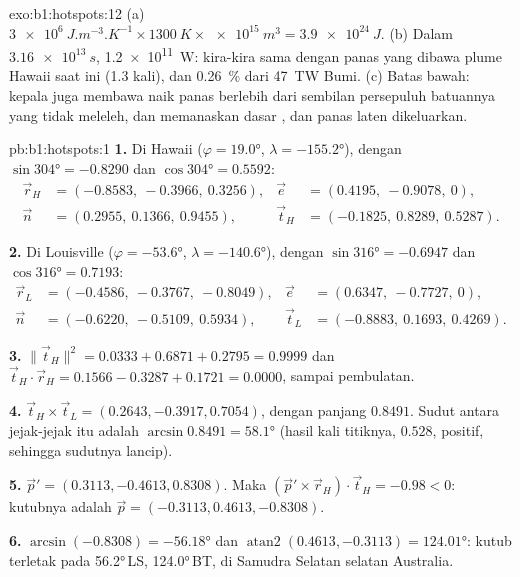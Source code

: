 \begin{solution}{exo:b1:hotspots:12}
(a) $\qty{3e6}{J.m^{-3}.K^{-1}}\times\qty{1300}{K}\times\qty{e15}{m^3} =
\qty{3.9e24}{J}$. (b) Dalam $\qty{3.16e13}{s}$, \qty{1.2e11}{W}: kira-kira sama dengan
panas yang dibawa plume Hawaii saat ini (1.3 kali), dan \qty{0.26}{\percent}
dari \qty{47}{TW} Bumi. (c) Batas bawah: kepala juga membawa naik panas berlebih dari
sembilan persepuluh batuannya yang tidak meleleh, dan memanaskan dasar , dan panas laten dikeluarkan.
\end{solution}

\begin{solution}{pb:b1:hotspots:1}
\textbf{1.} Di Hawaii ($\varphi = \ang{19.0}$, $\lambda = \ang{-155.2}$),
dengan $\sin\ang{304} = -0.8290$ dan $\cos\ang{304} = 0.5592$:
\[
\begin{aligned}
  \vec r_H &= (-0.8583,\ -0.3966,\ 0.3256), &
  \vec e &= (0.4195,\ -0.9078,\ 0),\\
  \vec n &= (0.2955,\ 0.1366,\ 0.9455), &
  \vec t_H &= (-0.1825,\ 0.8289,\ 0.5287).
\end{aligned}
\]

\textbf{2.} Di Louisville ($\varphi = \ang{-53.6}$, $\lambda = \ang{-140.6}$),
dengan $\sin\ang{316} = -0.6947$ dan $\cos\ang{316} = 0.7193$:
\[
\begin{aligned}
  \vec r_L &= (-0.4586,\ -0.3767,\ -0.8049), &
  \vec e &= (0.6347,\ -0.7727,\ 0),\\
  \vec n &= (-0.6220,\ -0.5109,\ 0.5934), &
  \vec t_L &= (-0.8883,\ 0.1693,\ 0.4269).
\end{aligned}
\]

\textbf{3.} $\lVert\vec t_H\rVert^2 = 0.0333 + 0.6871 + 0.2795 = 0.9999$ dan
$\vec t_H\cdot\vec r_H = 0.1566 - 0.3287 + 0.1721 = 0.0000$, sampai pembulatan.

\textbf{4.} $\vec t_H\times\vec t_L = (0.2643, -0.3917, 0.7054)$, dengan panjang
$0.8491$. Sudut antara jejak-jejak itu adalah $\arcsin0.8491 = \ang{58.1}$ (hasil kali
titiknya, $0.528$, positif, sehingga sudutnya lancip).

\textbf{5.} $\vec p' = (0.3113, -0.4613, 0.8308)$. Maka
$(\vec p'\times\vec r_H)\cdot\vec t_H = -0.98 < 0$: kutubnya adalah
$\vec p = (-0.3113, 0.4613, -0.8308)$.

\textbf{6.} $\arcsin(-0.8308) = \ang{-56.18}$ dan
$\operatorname{atan2}(0.4613, -0.3113) = \ang{124.01}$: kutub terletak pada
\ang{56.2}\,LS, \ang{124.0}\,BT, di Samudra Selatan selatan Australia.


\end{solution}
